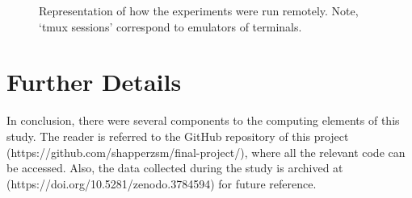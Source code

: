 \begin{figure}
    \centering
    \resizebox{\textwidth}{!}{}
    \caption{Representation of how the experiments were run remotely. Note, `tmux sessions' correspond to emulators of terminals.}\label{fig:restate_remote_comp}
\end{figure}

\section{Further Details}
In conclusion, there were several components to the computing elements of this
study. The reader is referred to the GitHub repository of this 
project \\ (https://github.com/shapperzsm/final-project/),
where all the relevant code can be accessed. Also, the data collected during the
study is archived at (https://doi.org/10.5281/zenodo.3784594) for future reference.